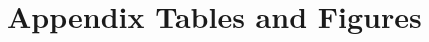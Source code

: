 \documentclass[12pt]{article}
\begin{document}
\newpage
\appendix
\setcounter{table}{0}
\renewcommand{\tablename}{Appendix Table}
\renewcommand{\figurename}{Appendix Figure}
\renewcommand{\thetable}{A\arabic{table}}
\setcounter{figure}{0}
\renewcommand{\thefigure}{A\arabic{figure}}

\section{Appendix Tables and Figures}
% 


\end{document}
